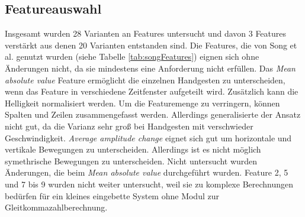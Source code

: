 \subsection{Featureauswahl}
Insgesamt wurden 28 Varianten an Features untersucht und davon 3 Features verstärkt aus denen 20 Varianten entstanden sind. Die Features, die von Song et al. genutzt wurden
(siehe Tabelle \ref{tab:songFeatures}) eignen sich ohne Änderungen nicht, da sie mindestens eine Anforderung nicht erfüllen.
\newline
\newline
Das \textit{Mean absolute value} Feature ermöglicht die einzelnen Handgesten zu unterscheiden, wenn das Feature in verschiedene Zeitfenster aufgeteilt wird. Zusätzlich kann die Helligkeit normalisiert werden.
Um die Featuremenge zu verringern, können Spalten und Zeilen zusammengefasst werden. Allerdings generalisierte der Ansatz nicht gut, da die Varianz sehr groß bei Handgesten mit verschwieder Geschwindigkeit.
\newline
\newline
\textit{Average amplitude change} eignet sich gut um horizontale und vertikale Bewegungen zu unterscheiden. Allerdings ist es nicht möglich symethrische Bewegungen zu unterscheiden. Nicht untersucht wurden
Änderungen, die beim \textit{Mean absolute value} durchgeführt wurden.
\newline
\newline
Feature 2, 5 und 7 bis 9 wurden nicht weiter untersucht, weil sie zu komplexe Berechnungen bedürfen für ein kleines eingebette System ohne Modul zur Gleitkommazahlberechnung.


